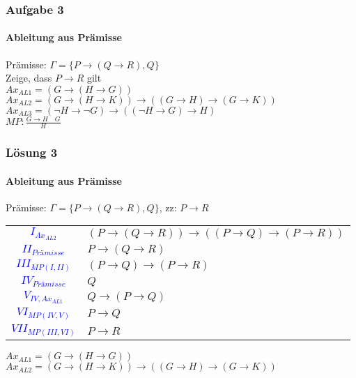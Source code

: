 \documentclass{beamer}
\begin{document}
	\begin{frame}
		\frametitle{Aufgabe 3}
		\framesubtitle{Ableitung aus Prämisse}
		Prämisse: $\Gamma =\{P\rightarrow(Q\rightarrow R), Q\}$\\
		Zeige, dass $P\rightarrow R$ gilt\\
		$Ax_{AL1} = (G\rightarrow(H\rightarrow G))$\\
		$Ax_{AL2} = (G\rightarrow(H\rightarrow K))\rightarrow((G\rightarrow H)\rightarrow(G\rightarrow K))$\\
		$Ax_{AL3} = (\neg H\rightarrow\neg G)\rightarrow((\neg H\rightarrow G)\rightarrow H)$\\
		$MP : \frac{G\rightarrow H\quad G}{H}$\\
	\end{frame}
	\begin{frame}
		\frametitle{Lösung 3}
		\framesubtitle{Ableitung aus Prämisse}
		Prämisse: $\Gamma =\{P\rightarrow(Q\rightarrow R), Q\}$, zz: $P\rightarrow R$\\
		\begin{tabular}{cl}
			\textcolor{blue}{$I_{Ax_{AL2}}$} & $(P\rightarrow(Q\rightarrow R))\rightarrow((P\rightarrow Q)\rightarrow(P\rightarrow R))$\\
			\textcolor{blue}{$II_{Prämisse}$} & $P\rightarrow(Q\rightarrow R)$\\
			\textcolor{blue}{$III_{MP(I, II)}$} & $(P\rightarrow Q)\rightarrow(P\rightarrow R)$\\
			\textcolor{blue}{$IV_{Prämisse}$} & $Q$\\
			\textcolor{blue}{$V_{IV, Ax_{AL1}}$} & $Q\rightarrow(P\rightarrow Q)$\\
			\textcolor{blue}{$VI_{MP(IV, V)}$} & $P\rightarrow Q$\\
			\textcolor{blue}{$VII_{MP(III, VI)}$} & $P\rightarrow R$\\
		\end{tabular}
		$Ax_{AL1} = (G\rightarrow(H\rightarrow G))$\\
		$Ax_{AL2} = (G\rightarrow(H\rightarrow K))\rightarrow((G\rightarrow H)\rightarrow(G\rightarrow K))$\\
	\end{frame}
\end{document}
